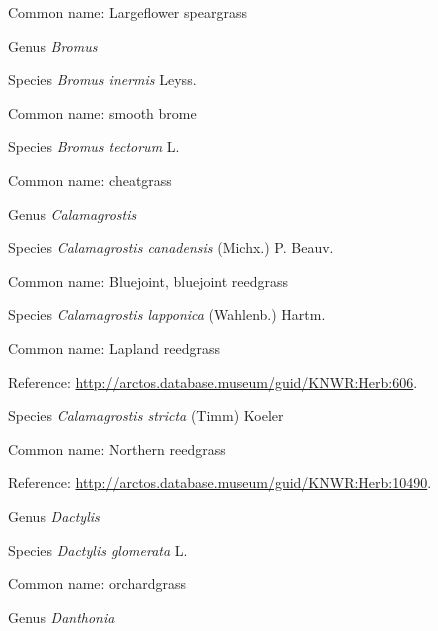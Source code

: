 \documentclass[9pt, article]{memoir}
\begin{document}
\begin{multicols}{2}
Common name: Largeflower speargrass

\vspace{6pt}\noindent\hspace{30pt}Genus \textit{Bromus}


\vspace{6pt}\noindent\hspace{36pt}Species \textit{Bromus inermis} Leyss.


Common name: smooth brome

\vspace{6pt}\noindent\hspace{36pt}Species \textit{Bromus tectorum} L.


Common name: cheatgrass

\vspace{6pt}\noindent\hspace{30pt}Genus \textit{Calamagrostis}


\vspace{6pt}\noindent\hspace{36pt}Species \textit{Calamagrostis canadensis} (Michx.) P. Beauv.


Common name: Bluejoint, bluejoint reedgrass

\vspace{6pt}\noindent\hspace{36pt}Species \textit{Calamagrostis lapponica} (Wahlenb.) Hartm.


Common name: Lapland reedgrass

Reference: 
\url{http://arctos.database.museum/guid/KNWR:Herb:606}.

\vspace{6pt}\noindent\hspace{36pt}Species \textit{Calamagrostis stricta} (Timm) Koeler


Common name: Northern reedgrass

Reference: 
\url{http://arctos.database.museum/guid/KNWR:Herb:10490}.

\vspace{6pt}\noindent\hspace{30pt}Genus \textit{Dactylis}


\vspace{6pt}\noindent\hspace{36pt}Species \textit{Dactylis glomerata} L.


Common name: orchardgrass

\vspace{6pt}\noindent\hspace{30pt}Genus \textit{Danthonia}



\end{multicols}
\end{document}
